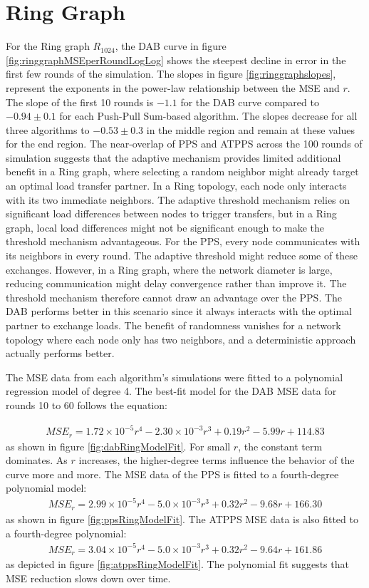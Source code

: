 \section{Ring Graph}\label{sec:ringgraph}
For the Ring graph $R_{1024}$, the DAB curve in figure \ref{fig:ringgraphMSEperRoundLogLog} shows the steepest decline in error in the first few rounds of the simulation. The slopes in figure \ref{fig:ringgraphslopes}, represent the exponents in the power-law relationship between the MSE and $r$. The slope of the first 10 rounds is $-1.1$ for the DAB curve compared to $-0.94 \pm 0.1$ for each Push-Pull Sum-based algorithm. The slopes decrease for all three algorithms to $-0.53 \pm 0.3$ in the middle region and remain at these values for the end region. The near-overlap of PPS and ATPPS across the 100 rounds of simulation suggests that the adaptive mechanism provides limited additional benefit in a Ring graph, where selecting a random neighbor might already target an optimal load transfer partner. In a Ring topology, each node only interacts with its two immediate neighbors. The adaptive threshold mechanism relies on significant load differences between nodes to trigger transfers, but in a Ring graph, local load differences might not be significant enough to make the threshold mechanism advantageous. For the PPS, every node communicates with its neighbors in every round. The adaptive threshold might reduce some of these exchanges. However, in a Ring graph, where the network diameter is large, reducing communication might delay convergence rather than improve it. The threshold mechanism therefore cannot draw an advantage over the PPS. The DAB performs better in this scenario since it always interacts with the optimal partner to exchange loads. The benefit of randomness vanishes for a network topology where each node only has two neighbors, and a deterministic approach actually performs better.

The MSE data from each algorithm's simulations were fitted to a polynomial regression model of degree 4. The best-fit model for the DAB MSE data for rounds 10 to 60 follows the equation:

\begin{align}
    MSE_r=1.72\times 10^{-5}r^{4}-2.30\times 10^{-3}r^{3}+ 0.19r^{2}-5.99r+114.83
\end{align}
as shown in figure \ref{fig:dabRingModelFit}. For small $r$, the constant term dominates. As $r$ increases, the higher-degree terms influence the behavior of the curve more and more. The MSE data of the PPS is fitted to a fourth-degree polynomial model:
\begin{align}
    MSE_r= 2.99\times 10^{-5}r^{4}-5.0\times 10^{-3}r^{3} + 0.32r^{2} -9.68r + 166.30
\end{align}
as shown in figure \ref{fig:ppsRingModelFit}. The ATPPS MSE data is also fitted to a fourth-degree polynomial:
\begin{align}
    MSE_r=3.04\times 10^{-5}r^{4}-5.0\times 10^{-3}r^{3} + 0.32r^{2}-9.64r+161.86
\end{align}
as depicted in figure \ref{fig:atppsRingModelFit}. The polynomial fit suggests that MSE reduction slows down over time.

